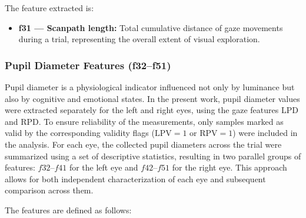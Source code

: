 \documentclass{article}
\begin{document}
\noindent The feature extracted is:

\begin{itemize}
    \item \textbf{f31 — Scanpath length:} Total cumulative distance of gaze movements during a trial, representing the overall extent of visual exploration.
\end{itemize}


\subsubsection{Pupil Diameter Features (f32–f51)}

Pupil diameter is a physiological indicator influenced not only by luminance but also by cognitive and emotional states. 
In the present work, pupil diameter values were extracted separately for the left and right eyes, using the gaze features \(\mathrm{LPD}\) and \(\mathrm{RPD}\). 
To ensure reliability of the measurements, only samples marked as valid by the corresponding validity flags (\(\mathrm{LPV} = 1\) or \(\mathrm{RPV} = 1\)) were included in the analysis. 
For each eye, the collected pupil diameters across the trial were summarized using a set of descriptive statistics, resulting in two parallel groups of features: \(f32\)--\(f41\) for the left eye and \(f42\)--\(f51\) for the right eye. 
This approach allows for both independent characterization of each eye and subsequent comparison across them.

The features are defined as follows:
\end{document}
